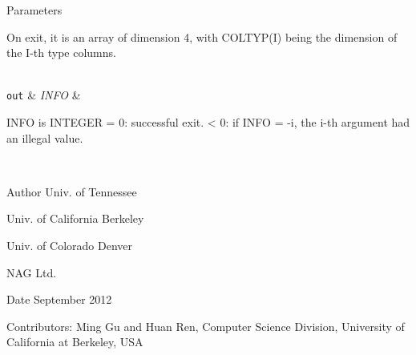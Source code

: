 \begin{DoxyParams}[1]{Parameters}
\begin{DoxyVerb}
         On exit, it is an array of dimension 4, with COLTYP(I) being
         the dimension of the I-th type columns.\end{DoxyVerb}
\\
\hline
\mbox{\tt out}  & {\em I\+N\+F\+O} & \begin{DoxyVerb}          INFO is INTEGER
          = 0:  successful exit.
          < 0:  if INFO = -i, the i-th argument had an illegal value.\end{DoxyVerb}
 \\
\hline
\end{DoxyParams}
\begin{DoxyAuthor}{Author}
Univ. of Tennessee 

Univ. of California Berkeley 

Univ. of Colorado Denver 

N\+A\+G Ltd. 
\end{DoxyAuthor}
\begin{DoxyDate}{Date}
September 2012 
\end{DoxyDate}
\begin{DoxyParagraph}{Contributors\+: }
Ming Gu and Huan Ren, Computer Science Division, University of California at Berkeley, U\+S\+A 
\end{DoxyParagraph}
\hypertarget{group__auxOTHERauxiliary_ga4359e33241fa45b40ca5b25e6bee9054}{}
